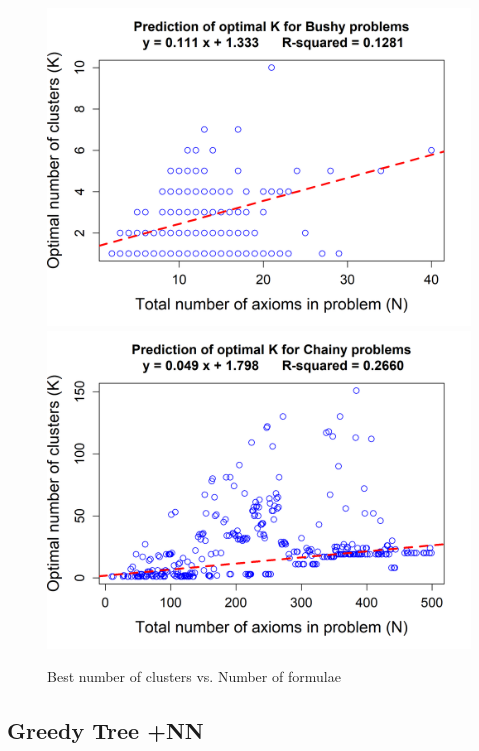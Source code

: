 \documentclass[EPiC]{easychair}
\begin{document}
\begin{figure}[h]
\centering
\includegraphics[scale=0.42]{median-regression-optimal-k-bushy.png}
\includegraphics[scale=0.42]{median-regression-optimal-k-chainy.png}
\caption{Best number of clusters vs. Number of formulae}
\label{fig:median-regression}
\end{figure}

\subsection{Greedy Tree +NN}
\label{Zihao}
\end{document}
